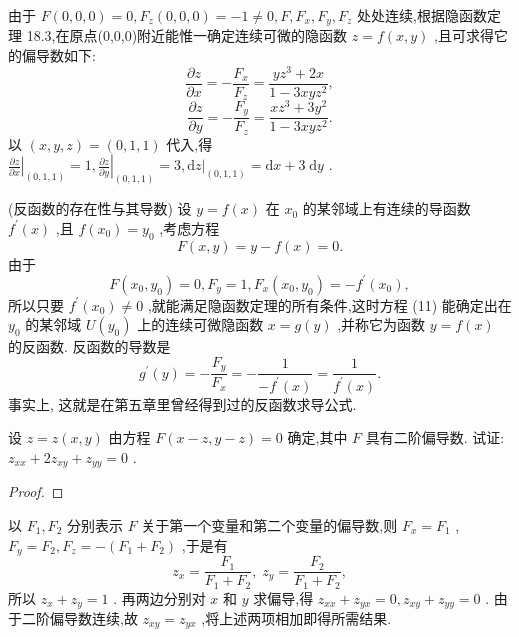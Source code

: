 \begin{solution}

\end{solution}
由于 \(F\left( {0,0,0}\right)  = 0,{F}_{z}\left( {0,0,0}\right)  =  - 1 \neq  0,F,{F}_{x},{F}_{y},{F}_{z}\) 处处连续,根据隐函数定理 18.3,在原点(0,0,0)附近能惟一确定连续可微的隐函数 \(z = f\left( {x,y}\right)\) ,且可求得它的偏导数如下:
\[
\frac{\partial z}{\partial x} =  - \frac{{F}_{x}}{{F}_{z}} = \frac{y{z}^{3} + {2x}}{1 - {3xy}{z}^{2}},
\]
\[
\frac{\partial z}{\partial y} =  - \frac{{F}_{y}}{{F}_{z}} = \frac{x{z}^{3} + 3{y}^{2}}{1 - {3xy}{z}^{2}}.
\]
以 \(\left( {x,y,z}\right)  = \left( {0,1,1}\right)\) 代入,得 \({\left. \frac{\partial z}{\partial x}\right| }_{\left( 0,1,1\right) } = 1,{\left. \frac{\partial z}{\partial y}\right| }_{\left( 0,1,1\right) } = 3,{\left. \mathrm{d}z\right| }_{\left( 0,1,1\right) } = \mathrm{d}x + 3\mathrm{\;d}y\) .

\begin{example}

\end{example}
(反函数的存在性与其导数) 设 \(y = f\left( x\right)\) 在 \({x}_{0}\) 的某邻域上有连续的导函数 \({f}^{\prime }\left( x\right)\) ,且 \(f\left( {x}_{0}\right)  = {y}_{0}\) ,考虑方程
\[
F\left( {x,y}\right)  = y - f\left( x\right)  = 0. \tag{11}
\]
由于
\[
F\left( {{x}_{0},{y}_{0}}\right)  = 0,{F}_{y} = 1,{F}_{x}\left( {{x}_{0},{y}_{0}}\right)  =  - {f}^{\prime }\left( {x}_{0}\right) ,
\]
所以只要 \({f}^{\prime }\left( {x}_{0}\right)  \neq  0\) ,就能满足隐函数定理的所有条件,这时方程 (11) 能确定出在 \({y}_{0}\) 的某邻域 \(U\left( {y}_{0}\right)\) 上的连续可微隐函数 \(x = g\left( y\right)\) ,并称它为函数 \(y = f\left( x\right)\) 的反函数. 反函数的导数是
\[
{g}^{\prime }\left( y\right)  =  - \frac{{F}_{y}}{{F}_{x}} =  - \frac{1}{-{f}^{\prime }\left( x\right) } = \frac{1}{{f}^{\prime }\left( x\right) }. \tag{12}
\]
事实上, 这就是在第五章里曾经得到过的反函数求导公式.

\begin{example}

\end{example}
设 \(z = z\left( {x,y}\right)\) 由方程 \(F\left( {x - z,y - z}\right)  = 0\) 确定,其中 \(F\) 具有二阶偏导数. 试证: \({z}_{xx} + 2{z}_{xy} + {z}_{yy} = 0\) .

\begin{proof}

\end{proof}
以 \({F}_{1},{F}_{2}\) 分别表示 \(F\) 关于第一个变量和第二个变量的偏导数,则 \({F}_{x} = {F}_{1}\) , \({F}_{y} = {F}_{2},{F}_{z} =  - \left( {{F}_{1} + {F}_{2}}\right)\) ,于是有
\[
{z}_{x} = \frac{{F}_{1}}{{F}_{1} + {F}_{2}},\;{z}_{y} = \frac{{F}_{2}}{{F}_{1} + {F}_{2}},
\]
所以 \({z}_{x} + {z}_{y} = 1\) . 再两边分别对 \(x\) 和 \(y\) 求偏导,得 \({z}_{xx} + {z}_{yx} = 0,{z}_{xy} + {z}_{yy} = 0\) . 由于二阶偏导数连续,故 \({z}_{xy} = {z}_{yx}\) ,将上述两项相加即得所需结果.

